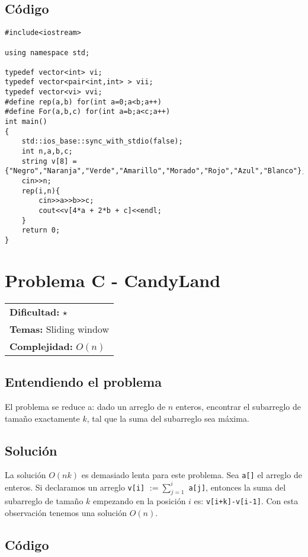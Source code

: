 \subsection*{Código}

\begin{verbatim}
#include<iostream>

using namespace std;

typedef vector<int> vi;
typedef vector<pair<int,int> > vii;
typedef vector<vi> vvi;
#define rep(a,b) for(int a=0;a<b;a++)
#define For(a,b,c) for(int a=b;a<c;a++)
int main()
{
    std::ios_base::sync_with_stdio(false);
    int n,a,b,c;
    string v[8] = {"Negro","Naranja","Verde","Amarillo","Morado","Rojo","Azul","Blanco"};
    cin>>n;
    rep(i,n){
        cin>>a>>b>>c;
        cout<<v[4*a + 2*b + c]<<endl;
    }
    return 0;
}
\end{verbatim}

\section{Problema C - CandyLand}

\hfill
\begin{tabular}{@{}l@{}}
\textbf{Dificultad:} $\star$ \\
\textbf{Temas:} Sliding window \\
\textbf{Complejidad:} $O(n)$
\end{tabular}

\subsection*{Entendiendo el problema}
El problema se reduce a: dado un arreglo de $n$ enteros, encontrar el subarreglo de tamaño exactamente $k$, tal que la suma del subarreglo sea máxima.
\subsection*{Solución}
La solución $O(nk)$ es demasiado lenta para este problema. Sea \texttt{a[]} el arreglo de enteros. Si declaramos un arreglo \texttt{v[i]} $:= \sum_{j=1}^i$ \texttt{a[j]}, entonces la suma del subarreglo de tamaño $k$ empezando en la posición $i$ es: \texttt{v[i+k]-v[i-1]}. Con esta observación tenemos una solución $O(n)$.
\subsection*{Código}


